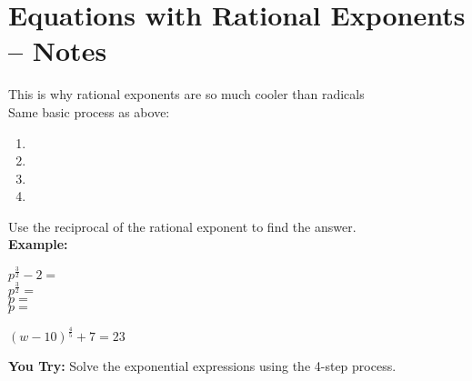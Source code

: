 \documentclass[12pt]{article}
\begin{document}
\pagebreak

\section{Equations with Rational Exponents -- Notes}

This is why rational exponents are so much cooler than radicals\\

Same basic process as above:

\begin{enumerate}

	\item 
	
	\item 
	
	\item 
	
	\item 
\end{enumerate}

Use the reciprocal of the rational exponent to find the answer.\\

\textbf{Example:}

\begin{multicols}{2}

$p^{\frac{3}{2}}-2= $\\

$p^{\frac{3}{2}}= $\\

$p=$\\

$p=$\\

\vfill

\columnbreak

$(w-10)^{\frac{4}{5}}+7= 23$\\



\end{multicols}

\hrulefill

\textbf{You Try:} Solve the exponential expressions using the 4-step process.\\
\end{document}
